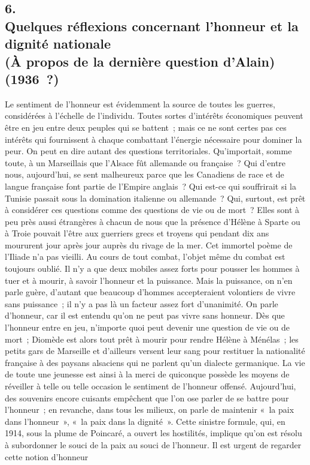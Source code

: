 \documentclass[french,twoside]{book} %
\begin{document}
\par

\begin{center}
\noindent \centerline{}
\end{center}

\subsection[{6. Quelques réflexions concernant l'honneur et la dignité nationale, (À propos de la dernière question d'Alain) (1936 ?)}]{6. \\
Quelques réflexions concernant l'honneur et la dignité nationale \\
(À propos de la dernière question d'Alain) \\
(1936 ?)}
\noindent \par
Le sentiment de l'honneur est évidemment la source de toutes les guerres, considérées à l'échelle de l'individu. Toutes sortes d'intérêts économiques peuvent être en jeu entre deux peuples qui se battent ; mais ce ne sont certes pas ces intérêts qui fournissent à chaque combattant l'énergie nécessaire pour dominer la peur. On peut en dire autant des questions territoriales. Qu'impor­tait, somme toute, à un Marseillais que l'Alsace fût allemande ou française ? Qui d'entre nous, aujourd'hui, se sent malheureux parce que les Canadiens de race et de langue française font partie de l'Empire anglais ? Qui est-ce qui souffrirait si la Tunisie passait sous la domination italienne ou allemande ? Qui, surtout, est prêt à considérer ces questions comme des questions de vie ou de mort ? Elles sont à peu près aussi étrangères à chacun de nous que la présence d'Hélène à Sparte ou à Troie pouvait l'être aux guerriers grecs et troyens qui pendant dix ans moururent jour après jour auprès du rivage de la mer. Cet immortel poème de l'Iliade n'a pas vieilli. Au cours de tout combat, l'objet même du combat est toujours oublié. Il n'y a que deux mobiles assez forts pour pousser les hommes à tuer et à mourir, à savoir l'honneur et la puissance. Mais la puissance, on n'en parle guère, d'autant que beaucoup d'hommes accepteraient volontiers de vivre sans puissance ; il n'y a pas là un facteur assez fort d'unanimité. On parle d'honneur, car il est entendu qu'on ne peut pas vivre sans honneur. Dès que l'honneur entre en jeu, n'importe quoi peut devenir une question de vie ou de mort ; Diomède est alors tout prêt à mourir pour rendre Hélène à Ménélas ; les petits gars de Marseille et d'ailleurs versent leur sang pour restituer la nationalité française à des paysans alsaciens qui ne parlent qu'un dialecte germanique. La vie de toute une jeunesse est ainsi à la merci de quiconque possède les moyens de réveiller à telle ou telle occasion le sentiment de l'honneur offensé. Aujourd'hui, des souvenirs encore cuisants empêchent que l'on ose parler de se battre pour l'honneur ; en revanche, dans tous les milieux, on parle de maintenir « la paix dans l'honneur », « la paix dans la dignité ». Cette sinistre formule, qui, en 1914, sous la plume de Poincaré, a ouvert les hostilités, implique qu'on est résolu à subordonner le souci de la paix au souci de l'honneur. Il est urgent de regarder cette notion d'honneur 
\end{document}
